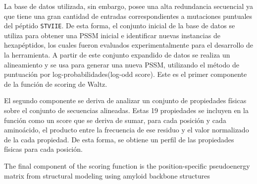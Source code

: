 La base de datos utilizada, sin embargo, posee una alta redundancia secuencial ya que tiene una gran cantidad de entradas correspondientes a mutaciones puntuales del péptido \texttt{STVIIE}.
De esta forma, el conjunto inicial de la base de datos se utiliza para obtener una PSSM inicial e identificar nuevas instancias de hexapéptidos, los cuales fueron evaluados experimentalmente para el desarrollo de la herramienta.
A partir de este conjunto expandido de datos se realiza un alineamiento y se usa para generar una nueva PSSM, utilizando el método de puntuación por log-probabilidades(log-odd score).
Este es el primer componente de la función de scoring de Waltz.


El segundo componente se deriva de analizar un conjunto de propiedades físicas sobre el conjunto de secuencias alineadas.
Estas 19 propiedades se incluyen en la función como un score que se deriva de sumar, para cada posición y cada aminoácido, el producto entre la frecuencia de ese residuo
y el valor normalizado de la cada propiedad. De esta forma, se obtiene un perfil de las propiedades físicas para cada posición.



The final component of the scoring function is the position-specific pseudoenergy matrix from structural modeling using amyloid backbone structures
% 
%









